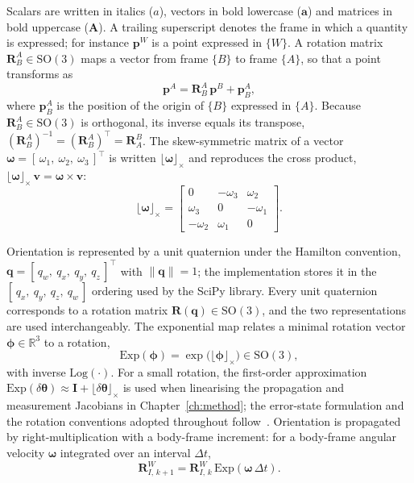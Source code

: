Scalars are written in italics ($a$), vectors in bold lowercase ($\mathbf{a}$) and matrices in bold uppercase ($\mathbf{A}$). A trailing superscript denotes the frame in which a quantity is expressed; for instance $\mathbf{p}^{W}$ is a point expressed in $\{W\}$. A rotation matrix $\mathbf{R}_{B}^{A} \in \mathrm{SO}(3)$ maps a vector from frame $\{B\}$ to frame $\{A\}$, so that a point transforms as
\begin{equation}
  \mathbf{p}^{A} = \mathbf{R}_{B}^{A}\,\mathbf{p}^{B} + \mathbf{p}_{B}^{A},
\end{equation}
where $\mathbf{p}_{B}^{A}$ is the position of the origin of $\{B\}$ expressed in $\{A\}$. Because $\mathbf{R}_{B}^{A} \in \mathrm{SO}(3)$ is orthogonal, its inverse equals its transpose, $(\mathbf{R}_{B}^{A})^{-1} = (\mathbf{R}_{B}^{A})^{\top} = \mathbf{R}_{A}^{B}$. The skew-symmetric matrix of a vector $\boldsymbol{\omega} = [\,\omega_1,\ \omega_2,\ \omega_3\,]^{\top}$ is written $\lfloor \boldsymbol{\omega} \rfloor_{\times}$ and reproduces the cross product, $\lfloor \boldsymbol{\omega} \rfloor_{\times}\,\mathbf{v} = \boldsymbol{\omega} \times \mathbf{v}$:
\begin{equation}
  \lfloor \boldsymbol{\omega} \rfloor_{\times} =
  \begin{bmatrix}
    0 & -\omega_3 & \omega_2 \\
    \omega_3 & 0 & -\omega_1 \\
    -\omega_2 & \omega_1 & 0
  \end{bmatrix}.
\end{equation}

Orientation is represented by a unit quaternion under the Hamilton convention, $\mathbf{q} = [\,q_w,\ q_x,\ q_y,\ q_z\,]^{\top}$ with $\lVert \mathbf{q} \rVert = 1$; the implementation stores it in the $[\,q_x,\ q_y,\ q_z,\ q_w\,]$ ordering used by the SciPy library. Every unit quaternion corresponds to a rotation matrix $\mathbf{R}(\mathbf{q}) \in \mathrm{SO}(3)$, and the two representations are used interchangeably. The exponential map relates a minimal rotation vector $\boldsymbol{\phi} \in \mathbb{R}^{3}$ to a rotation,
\begin{equation}
  \mathrm{Exp}(\boldsymbol{\phi}) = \exp\!\big(\lfloor \boldsymbol{\phi} \rfloor_{\times}\big) \in \mathrm{SO}(3),
\end{equation}
with inverse $\mathrm{Log}(\cdot)$. For a small rotation, the first-order approximation $\mathrm{Exp}(\delta\boldsymbol{\theta}) \approx \mathbf{I} + \lfloor \delta\boldsymbol{\theta} \rfloor_{\times}$ is used when linearising the propagation and measurement Jacobians in Chapter~\ref{ch:method}; the error-state formulation and the rotation conventions adopted throughout follow~\cite{Sola_2017}. Orientation is propagated by right-multiplication with a body-frame increment: for a body-frame angular velocity $\boldsymbol{\omega}$ integrated over an interval $\Delta t$,
\begin{equation}
  \mathbf{R}_{I,\,k+1}^{W} = \mathbf{R}_{I,\,k}^{W}\,\mathrm{Exp}(\boldsymbol{\omega}\,\Delta t).
  \label{eq:bg_rot_update}
\end{equation}

